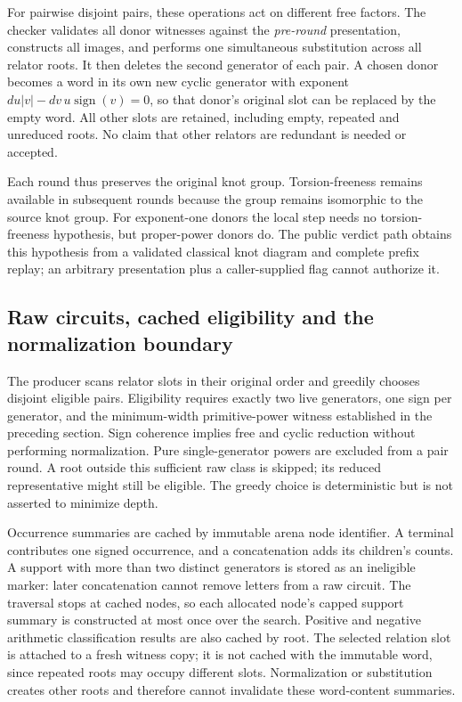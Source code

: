 For pairwise disjoint pairs, these operations act on different free
factors. The checker validates all donor witnesses against the
\emph{pre-round} presentation, constructs all images, and performs one
simultaneous substitution across all relator roots. It then deletes the
second generator of each pair. A chosen donor becomes a word in its own
new cyclic generator with exponent
$du|v|-dv\,u\operatorname{sign}(v)=0$, so that donor's original slot can
be replaced by the empty word. All other slots are retained, including
empty, repeated and unreduced roots. No claim that other relators are
redundant is needed or accepted.

Each round thus preserves the original knot group. Torsion-freeness remains
available in subsequent rounds because the group remains isomorphic to the
source knot group. For exponent-one donors the local step needs no
torsion-freeness hypothesis, but proper-power donors do. The public verdict
path obtains this hypothesis from a validated classical knot diagram and
complete prefix replay; an arbitrary presentation plus a caller-supplied
flag cannot authorize it.

\subsection{Raw circuits, cached eligibility and the normalization boundary}

The producer scans relator slots in their original order and greedily
chooses disjoint eligible pairs. Eligibility requires exactly two live
generators, one sign per generator, and the minimum-width primitive-power
witness established in the preceding section. Sign coherence implies free
and cyclic reduction without performing normalization. Pure single-generator
powers are excluded from a pair round. A root outside this sufficient raw
class is skipped; its reduced representative might still be eligible.
The greedy choice is deterministic but is not asserted to minimize depth.

Occurrence summaries are cached by immutable arena node identifier. A
terminal contributes one signed occurrence, and a concatenation adds its
children's counts. A support with more than two distinct generators is
stored as an ineligible marker: later concatenation cannot remove letters
from a raw circuit. The traversal stops at cached nodes, so each allocated
node's capped support summary is constructed at most once over the search.
Positive and negative arithmetic classification results are also cached by
root. The selected relation slot is attached to a fresh witness copy; it is
not cached with the immutable word, since repeated roots may occupy
different slots. Normalization or substitution creates other roots and
therefore cannot invalidate these word-content summaries.

